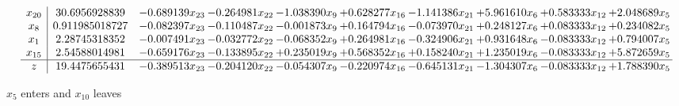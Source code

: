 \documentclass[10pt]{article}
\begin{document}
\[\begin{array}{c| c c@{\hskip 2pt} c@{\hskip 2pt} c@{\hskip 2pt} c@{\hskip 2pt} c@{\hskip 2pt} c@{\hskip 2pt} c@{\hskip 2pt} c@{\hskip 2pt} }
 x_{20}   &  30.6956928839 & -0.689139 x_{23} & -0.264981 x_{22} & -1.038390 x_{9} & + 0.628277 x_{16} & -1.141386 x_{21} & + 5.961610 x_{6} & + 0.583333 x_{12} & + 2.048689 x_{5}\\
 x_{8}   &  0.911985018727 & -0.082397 x_{23} & -0.110487 x_{22} & -0.001873 x_{9} & + 0.164794 x_{16} & -0.073970 x_{21} & + 0.248127 x_{6} & + 0.083333 x_{12} & + 0.234082 x_{5}\\
 x_{1}   &  2.28745318352 & -0.007491 x_{23} & -0.032772 x_{22} & -0.068352 x_{9} & + 0.264981 x_{16} & -0.324906 x_{21} & + 0.931648 x_{6} & -0.083333 x_{12} & + 0.794007 x_{5}\\
 x_{15}   &  2.54588014981 & -0.659176 x_{23} & -0.133895 x_{22} & + 0.235019 x_{9} & + 0.568352 x_{16} & + 0.158240 x_{21} & + 1.235019 x_{6} & -0.083333 x_{12} & + 5.872659 x_{5}\\
\hline
z    &  19.4475655431 & -0.389513 x_{23} & -0.204120 x_{22} & -0.054307 x_{9} & -0.220974 x_{16} & -0.645131 x_{21} & -1.304307 x_{6} & -0.083333 x_{12} & + 1.788390 x_{5}\\
\end{array}\]


 $ x_{5} $ enters and $ x_{10} $ leaves 
\end{document}
